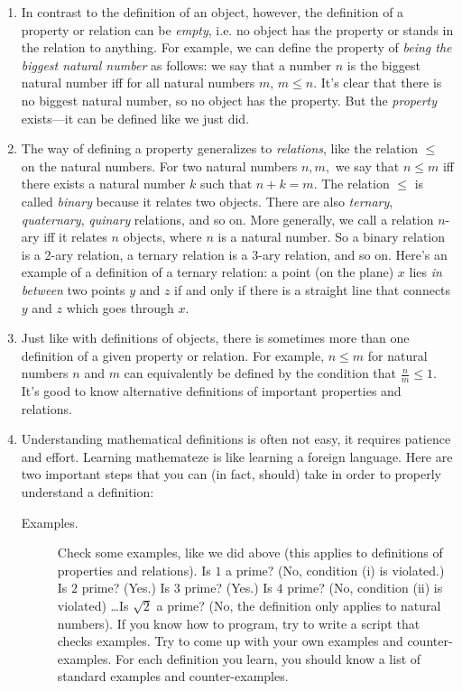 \begin{enumerate}[{\thesection}.1]
		\item In contrast to the definition of an object, however, the definition of a property or relation can be \emph{empty}, i.e. no object has the property or stands in the relation to anything. For example, we can define the property of \emph{being the biggest natural number} as follows: we say that a number $n$ is the biggest natural number iff for all natural numbers $m$, $m\leq n$. It's clear that there is no biggest natural number, so no object has the property. But the \emph{property} exists---it can be defined like we just did.
				
		\item The way of defining a property generalizes to \emph{relations}, like the relation $\leq$ on the natural numbers. For two natural numbers $n,m,$ we say that $n\leq m$ iff there exists a natural number $k$ such that $n+k=m$. The relation $\leq$ is called \emph{binary} because it relates two objects. There are also \emph{ternary}, \emph{quaternary}, \emph{quinary} relations, and so on. More generally, we call a relation $n$-ary iff it relates $n$ objects, where $n$ is a natural number. So a binary relation is a 2-ary relation, a ternary relation is a 3-ary relation, and so on. Here's an example of a definition of a ternary relation: a point (on the plane) $x$ lies \emph{in between} two points $y$ and $z$ if and only if there is a straight line that connects $y$ and $z$ which goes through $x$.
		
		\item Just like with definitions of objects, there is sometimes more than one definition of a given property or relation. For example, $n\leq m$ for natural numbers $n$ and $m$ can equivalently be defined by the condition that $\frac{n}{m}\leq 1$. It's good to know alternative definitions of important properties and relations.
		
		\item Understanding mathematical definitions is often not easy, it requires patience and effort. Learning mathemateze is like learning a foreign language. Here are two important steps that you can (in fact, should) take in order to properly understand a definition:

		\begin{description}
		
			\item[Examples.] Check some examples, like we did above (this applies to definitions of properties and relations). Is $1$ a prime? (No, condition (i) is violated.) Is $2$ prime? (Yes.) Is $3$ prime? (Yes.) Is $4$ prime? (No, condition (ii) is violated) \dots Is $\sqrt{2}$ a prime? (No, the definition only applies to natural numbers). If you know how to program, try to write a script that checks examples. Try to come up with your own examples and counter-examples. For each definition you learn, you should know a list of standard examples and counter-examples.


\end{description}
\end{enumerate}
